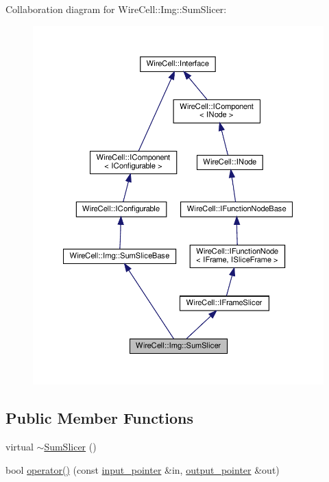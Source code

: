 Collaboration diagram for Wire\+Cell\+:\+:Img\+:\+:Sum\+Slicer\+:
\nopagebreak
\begin{figure}[H]
\begin{center}
\leavevmode
\includegraphics[width=350pt]{class_wire_cell_1_1_img_1_1_sum_slicer__coll__graph}
\end{center}
\end{figure}
\subsection*{Public Member Functions}
\begin{DoxyCompactItemize}
\item 
virtual \hyperlink{class_wire_cell_1_1_img_1_1_sum_slicer_aa025078967c6b07c07c47c9e9bb597ac}{$\sim$\+Sum\+Slicer} ()
\item 
bool \hyperlink{class_wire_cell_1_1_img_1_1_sum_slicer_aace8b802844078b3d58f1fcff9c30ebd}{operator()} (const \hyperlink{class_wire_cell_1_1_i_function_node_a55c0946156df9b712b8ad1a0b59b2db6}{input\+\_\+pointer} \&in, \hyperlink{class_wire_cell_1_1_i_function_node_afc02f1ec60d31aacddf64963f9ca650b}{output\+\_\+pointer} \&out)
\end{DoxyCompactItemize}
